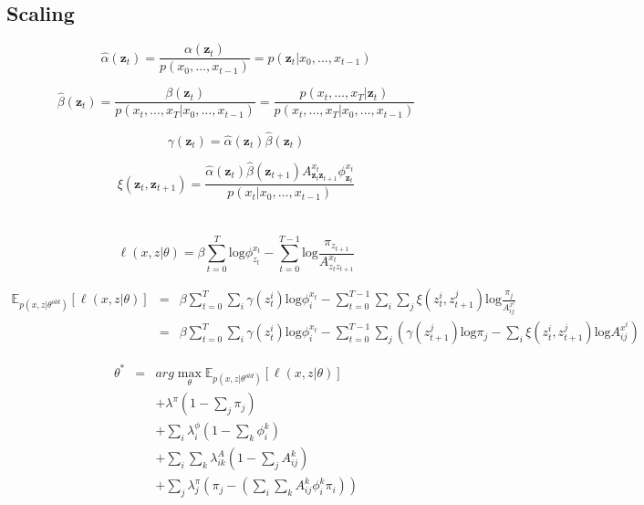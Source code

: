 \documentclass[11pt]{article}
\begin{document}
\subsection{Scaling}

\[
\hat{\alpha}(\mathbf{z}_t) = \frac{\alpha(\mathbf{z}_t)}{p(x_0,\ldots,x_{t-1})} = p(\mathbf{z}_t|x_0,\ldots,x_{t-1})
\]

\[
\hat{\beta}(\mathbf{z}_t) = \frac{\beta(\mathbf{z}_t)}{p(x_t,\ldots,x_T|x_0,\ldots,x_{t-1})} = \frac{p(x_t,\ldots,x_T|\mathbf{z}_t)}{p(x_t,\ldots,x_T|x_0,\ldots,x_{t-1})}
\]

\[
\gamma(\mathbf{z}_t) = \hat{\alpha}(\mathbf{z}_t)\hat{\beta}(\mathbf{z}_t)
\]

\[
\xi(\mathbf{z}_t,\mathbf{z}_{t+1}) = \frac{\hat{\alpha}(\mathbf{z}_t)\hat{\beta}(\mathbf{z}_{t+1})A^{x_t}_{\mathbf{z}_t\mathbf{z}_{t+1}}\phi^{x_t}_{\mathbf{z}_t}}{p(x_t|x_0,\ldots,x_{t-1})}
\]

\section{}

\[
\ell(x,z|\theta) = \beta \sum_{t=0}^T \mathrm{log}\phi^{x_t}_{z_t} - \sum_{t=0}^{T-1} \mathrm{log}\frac{\pi_{z_{t+1}}}{A^{x_t}_{z_t z_{t+1}}}
\]

\begin{eqnarray*}
\mathbb{E}_{p(x,z|\theta^{old})}[\ell(x,z|\theta)] & = & \beta\sum_{t=0}^T\sum_i \gamma(z_t^i) \mathrm{log}\phi_{i}^{x_t} - \sum_{t=0}^{T-1}\sum_i\sum_j \xi(z_{t}^i,z_{t+1}^j)\mathrm{log}\frac{\pi_j}{A^{x^t}_{ij}} \\
& = & \beta\sum_{t=0}^T\sum_i \gamma(z_t^i) \mathrm{log}\phi_{i}^{x_t} - \sum_{t=0}^{T-1}\sum_j \left(\gamma(z_{t+1}^j)\mathrm{log}\pi_j - \sum_i \xi(z_{t}^i,z_{t+1}^j)\mathrm{log}A^{x^t}_{ij}\right)
\end{eqnarray*}

\begin{eqnarray*}
\theta^* & = & arg \max_\theta \mathbb{E}_{p(x,z|\theta^{old})}[\ell(x,z|\theta)] \\
& & + \lambda^\pi \left(1 - \sum_j \pi_j \right) \\
& & + \sum_i\lambda^\phi_i \left(1 - \sum_k\phi_i^k\right) \\
& & + \sum_i\sum_k\lambda^A_{ik}\left(1-\sum_j A^k_{ij}\right) \\
& & + \sum_j \lambda^\pi_j\left(\pi_j - \left(\sum_i \sum_k A^k_{ij}\phi^k_i\pi_i\right)\right)
\end{eqnarray*}
\end{document}
